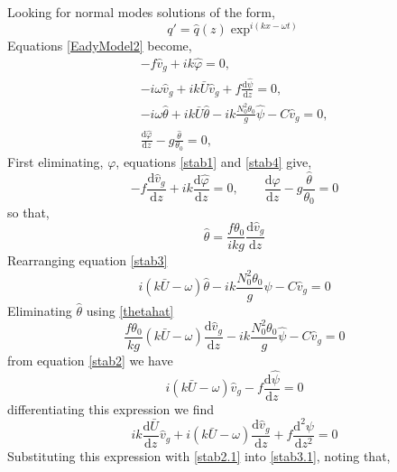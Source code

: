 Looking for normal modes solutions of the form,
\begin{equation*}
	q' = \hat{q}(z)\exp^{i \left(kx - \omega t\right)}
\end{equation*}
Equations \ref{EadyModel2} become,
\begin{align}
 		-f\hat{v}_g + ik\hat{\varphi} = 0,\label{stab1}\\
 	-i\omega \hat{v}_g + ik\bar{U}\hat{v}_g + f\frac{\text{d}\hat{\psi}}{\text{d}z} = 0,\label{stab2}\\
 	-i \omega \hat{\theta} + i k \bar{U} \hat{\theta} - ik\frac{N_0^2\theta_0}{g} \hat{\psi} - C\hat{v}_g = 0,\label{stab3}\\
 	\frac{\text{d}\hat{\varphi}}{\text{d}z} - g\frac{\hat{\theta}}{\theta_0} = 0 \label{stab4},
\end{align}
First eliminating, $\varphi$, equations \ref{stab1} and \ref{stab4} give,
\begin{equation*}
	-f\frac{\text{d}\hat{v}_g}{\text{d}z}+ik\frac{\text{d}\hat{\varphi}}{\text{d}z} = 0, \qquad \frac{\text{d}\hat{\varphi}}{\text{d}z} - g\frac{\hat{\theta}}{\theta_0} = 0
\end{equation*}
so that,
\begin{equation}
	\hat{\theta} = \frac{f\theta_0}{ikg} \frac{\text{d}\hat{v}_g}{\text{d}z}
\label{thetahat}
\end{equation}
Rearranging equation \ref{stab3}
\begin{equation}
	 i\left( k \bar{U} - \omega \right) \hat{\theta} - ik\frac{N_0^2\theta_0}{g} \hat{\psi} - C\hat{v}_g = 0
\label{stab3.1}
\end{equation}
Eliminating $\hat{\theta}$ using \ref{thetahat}
\begin{equation*}
	\frac{f\theta_0}{kg}\left( k \bar{U} - \omega \right)  \frac{\text{d}\hat{v}_g}{\text{d}z} - ik\frac{N_0^2\theta_0}{g} \hat{\psi} - C\hat{v}_g = 0
\end{equation*}
from equation \ref{stab2} we have
\begin{equation}
	i\left( k \bar{U} - \omega \right) \hat{v}_g - f \frac{\text{d}\hat{\psi}}{\text{d}z} = 0
\label{stab2.1}
\end{equation}
differentiating this expression we find
\begin{equation*}
	ik \frac{\text{d}\bar{U}}{\text{d}z} \hat{v}_g + i(k\bar{U}-\omega)\frac{\text{d}\hat{v}_g}{\text{d}z} + f\frac{\text{d}^2{\psi}}{\text{d}z^2} = 0 
\end{equation*}
Substituting this expression with \ref{stab2.1} into \ref{stab3.1}, noting that,

